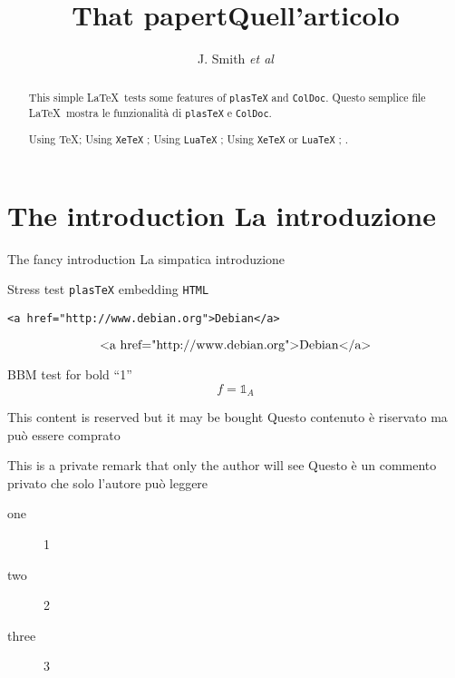 \documentclass[a4paper]{article}
\newif\ifplastex\plastexfalse
\newcommand\mathbbm[1]{{\mathbb{#1}}}
\begin{document}
\author{J. Smith
\emph{et al}
}
\title{\ifCDLeng That papert\fi\ifCDLita Quell'articolo\fi}
\maketitle
\section*{\ifCDLeng The introduction \fi  \ifCDLita La introduzione\fi}
\ifCDLeng The fancy introduction \fi  \ifCDLita La simpatica introduzione\fi

\begin{abstract}
  \CDLeng  This simple \LaTeX\ tests some features  of \texttt{plasTeX} and \texttt{ColDoc}.
  \CDLita Questo semplice file  \LaTeX\ mostra le funzionalità di  \texttt{plasTeX} e \texttt{ColDoc}.

  \ifetex Using  \TeX \fi ;
  \ifxetex Using \texttt{XeTeX} \fi ;
  \ifluatex Using \texttt{LuaTeX} \fi ;
  \iftutex Using \texttt{XeTeX} or \texttt{LuaTeX} \fi ;
  \ifplastex Using \texttt{plasTeX} \fi .

\end{abstract}

Stress test  \texttt{plasTeX} embedding \texttt{HTML}
\begin{verbatim}
<a href="http://www.debian.org">Debian</a>
\end{verbatim}
\[ \hbox{<a href="http://www.debian.org">Debian</a>} \]

BBM test for bold ``1''
\[f={\mathbbm{1}}_A\]

\begin{buyablecontent}
  \CDLeng  This content is reserved but it may be bought
  \CDLita  Questo contenuto è riservato ma può essere comprato
\end{buyablecontent}

\begin{privateremark}
  \CDLeng This is a private remark that only the author will see
  \CDLita Questo è un commento privato che solo l'autore può leggere
\end{privateremark}





\begin{description}
\item[one] 1
\item[two] 2 %
\item[three] 3
\end{description}
\end{document}
